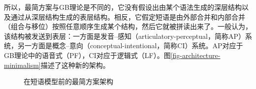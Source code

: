 所以，最简方案与GB理论是不同的，它没有假设出由某个\xbarc 语法生成的深层结构以及通过\moveac 从深层结构生成的表层结构。相反，它假定短语是由外部合并和内部合并（组合与移位）按照任意顺序生成某个结构，然后它就被拼读出来了。一般认为，该结构被发送到表层：一方面是发音--感知（articulatory-perceptual，简称AP）系统，另一方面是概念--意向（conceptual-intentional，简称CI）系统。AP对应于GB理论中的语音式（PF），CI对应于逻辑式（LF）。图\vref{fig-architecture-minimalism}描述了这种新的架构。
\begin{figure}
\caption{\label{fig-architecture-minimalism}在短语模型前的最简方案架构}
\end{figure}%
